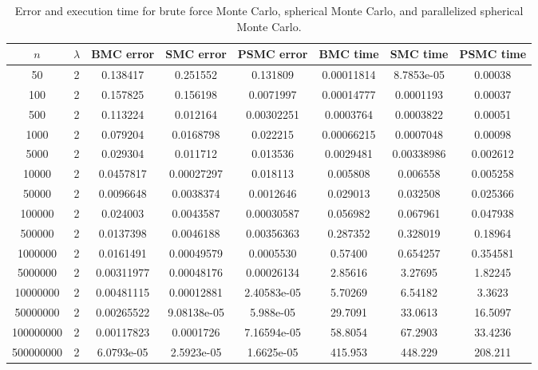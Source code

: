 \documentclass{article}
\begin{document}
  \begin{table}[ht]
    \centering
    \caption{Error and execution time for brute force Monte Carlo, spherical Monte Carlo, and parallelized spherical Monte Carlo.}
    \vspace{2mm}
    \label{tab:error-montecarlo}
    \begin{tabular}{|c|c|c|c|c|c|c|c|}
        \hline
        $n$ & $\lambda$ & BMC error & SMC error & PSMC error & BMC time & SMC time & PSMC time  \\
        \hline \hline
        50 & 2 & 0.138417 & 0.251552 & 0.131809 & 0.00011814 & 8.7853e-05 & 0.00038 \\
        100 & 2 & 0.157825 & 0.156198 & 0.0071997 & 0.00014777 & 0.0001193 & 0.00037 \\
        500 & 2 & 0.113224 & 0.012164 & 0.00302251 & 0.0003764 & 0.0003822 & 0.00051 \\
        1000 & 2 & 0.079204 & 0.0168798 & 0.022215 & 0.00066215 & 0.0007048 & 0.00098 \\
        5000 & 2 & 0.029304 & 0.011712 & 0.013536 & 0.0029481 & 0.00338986 & 0.002612 \\
        10000 & 2 & 0.0457817 & 0.00027297 & 0.018113 & 0.005808 & 0.006558 & 0.005258 \\
        50000 & 2 & 0.0096648 & 0.0038374 & 0.0012646 & 0.029013 & 0.032508 & 0.025366 \\
        100000 & 2 & 0.024003 & 0.0043587 & 0.00030587 & 0.056982 & 0.067961 & 0.047938 \\
        500000 & 2 & 0.0137398 & 0.0046188 & 0.00356363 & 0.287352 & 0.328019 & 0.18964 \\
        1000000 & 2 & 0.0161491 & 0.00049579 & 0.0005530 & 0.57400 & 0.654257 & 0.354581 \\
        5000000 & 2 & 0.00311977 & 0.00048176 & 0.00026134 & 2.85616 & 3.27695 & 1.82245 \\
        10000000 & 2 & 0.00481115 & 0.00012881 & 2.40583e-05 & 5.70269 & 6.54182 & 3.3623 \\
        50000000 & 2 & 0.00265522 & 9.08138e-05 & 5.988e-05 & 29.7091 & 33.0613 & 16.5097 \\
        100000000 & 2 & 0.00117823 & 0.0001726 & 7.16594e-05 & 58.8054 & 67.2903 & 33.4236 \\
        500000000 & 2 & 6.0793e-05 & 2.5923e-05 & 1.6625e-05 & 415.953 & 448.229 & 208.211 \\
        \hline
    \end{tabular} \\
    \hspace{0pt}\\
  \end{table}
\end{document}
